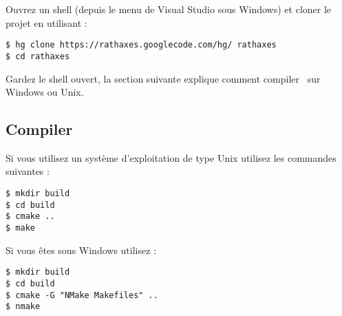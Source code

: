 \documentclass[francais]{rtxarticle}
\begin{document}
Ouvrez un shell (depuis le menu de Visual Studio sous Windows) et cloner le
projet en utilisant :

\begin{lstlisting}
$ hg clone https://rathaxes.googlecode.com/hg/ rathaxes
$ cd rathaxes
\end{lstlisting}

Gardez le shell ouvert, la section suivante explique comment compiler \rtx\ sur
Windows ou Unix.

\subsection{Compiler \rtx}

Si vous utilisez un système d'exploitation de type Unix utilisez les commandes
suivantes :

\begin{lstlisting}
$ mkdir build
$ cd build
$ cmake ..
$ make
\end{lstlisting}

Si vous êtes sous Windows utilisez :

\begin{lstlisting}
$ mkdir build
$ cd build
$ cmake -G "NMake Makefiles" ..
$ nmake
\end{lstlisting}

\rtxmaketitleblock
\end{document}
